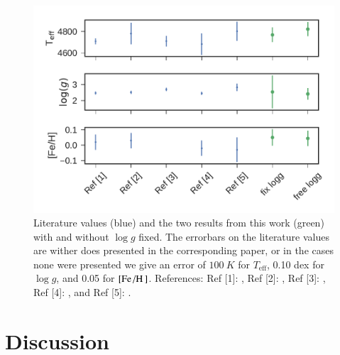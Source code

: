 \documentclass{aa}
\begin{document}
\begin{figure}[htpb!!]
    \centering
    \includegraphics[width=1.0\linewidth]{figures/10LeoParams.pdf}
    \caption{Literature values (blue) and the two results from this work (green)
             with and without $\log g$ fixed. The errorbars on the literature
             values are wither does presented in the corresponding paper, or in
             the cases none were presented we give an error of $\SI{100}{K}$ for
             $T_\mathrm{eff}$, 0.10 dex for $\log g$, and 0.05 for
             $[\ion{Fe}/\ion{H}]$.
             References:
             Ref [1]: \citet{Luck2015},
             Ref [2]: \citet{Park2013},
             Ref [3]: \citet{Massarotti2008},
             Ref [4]: \citet{Soubiran2008}, and
             Ref [5]: \cite{daSilva2011}.}
    \label{fig:10leo}
\end{figure}


%


\section{Discussion}
\label{sec:discussion}
\end{document}
